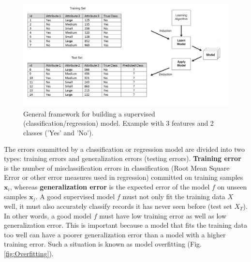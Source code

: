 
\begin{figure}[h!]
	\centering
	\includegraphics[width=0.9\linewidth]{images/LearningFramework}
	\caption{General framework for building a supervised (classification/regression) model. Example with 3 features and 2 classes ('Yes' and 'No').}
	\label{fig:LearningFramework}
\end{figure}


The errors committed by a classification or regression model are divided into two types: training errors and generalization errors (testing errors). \textbf{Training error} is the number of misclassification errors in classification (Root Mean Square Error or other error measures used in regression) committed on training samples $\textbf{x}_i$, whereas \textbf{generalization error} is the expected error of the model $f$ on unseen samples $\textbf{x}_j$. A good supervised model $f$ must not only fit the training data $X$ well, it must also accurately classify records it has never seen before (test set $X_T$). In other words, a good model $f$ must have low training error as well as low generalization error. This is important because a model that fits the training data too well can have a poorer generalization error than a model with a higher training error. Such a situation is known as model overfitting (Fig. \ref{fig:Overfitting}).

